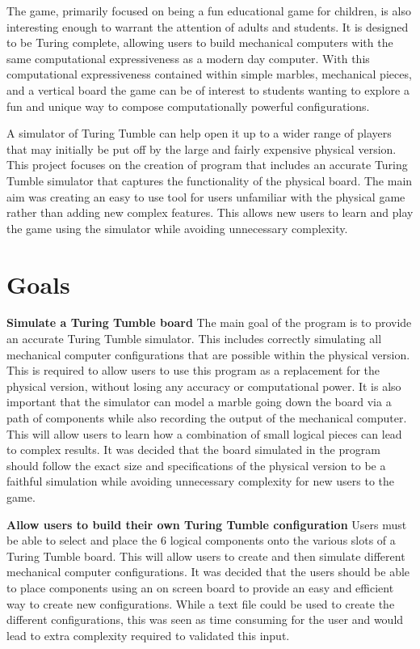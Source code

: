 \documentclass{l4proj}
\begin{document}
The game, primarily focused on being a fun educational game for children, is also interesting enough to warrant the attention of adults and students. It is designed to be Turing complete, allowing users to build mechanical computers with the same computational expressiveness as a modern day computer. With this computational expressiveness contained within simple marbles, mechanical pieces, and a vertical board the game can be of interest to students wanting to explore a fun and unique way to compose computationally powerful configurations.  

A simulator of Turing Tumble can help open it up to a wider range of players that may initially be put off by the large and fairly expensive physical version. This project focuses on the creation of program that includes an accurate Turing Tumble simulator that captures the functionality of the physical board. The main aim was creating an easy to use tool for users unfamiliar with the physical game rather than adding new complex features. This allows new users to learn and play the game using the simulator while avoiding unnecessary complexity. 


\section{Goals}
\textbf{Simulate a Turing Tumble board} The main goal of the program is to provide an accurate Turing Tumble simulator. This includes correctly simulating all mechanical computer configurations that are possible within the physical version. This is required to allow users to use this program as a replacement for the physical version, without losing any accuracy or computational power. It is also important that the simulator can model a marble going down the board via a path of components while also recording the output of the mechanical computer. This will allow users to learn how a combination of small logical pieces can lead to complex results. It was decided that the board simulated in the program should follow the exact size and specifications of the physical version to be a faithful simulation while avoiding unnecessary complexity for new users to the game.

\textbf{Allow users to build their own Turing Tumble configuration} Users must be able to select and place the 6 logical components onto the various slots of a Turing Tumble board. This will allow users to create and then simulate different mechanical computer configurations. It was decided that the users should be able to place components using an on screen board to provide an easy and efficient way to create new configurations. While a text file could be used to create the different configurations, this was seen as time consuming for the user and would lead to extra complexity required to validated this input. 
\end{document}

